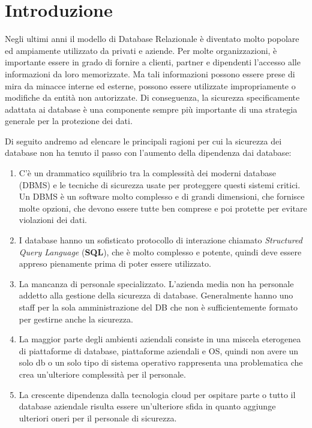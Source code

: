 \section{Introduzione}

Negli ultimi anni il modello di Database Relazionale è diventato molto popolare ed ampiamente utilizzato da
privati e aziende.
Per molte organizzazioni, è importante essere in grado di
fornire a clienti, partner e dipendenti l'accesso alle informazioni da loro memorizzate. Ma tali
informazioni possono essere prese di mira da minacce interne ed esterne, possono essere utilizzate
impropriamente o modifiche da entità non autorizzate. Di conseguenza, la sicurezza
specificamente adattata ai database è una componente sempre più importante di una strategia generale per la protezione dei dati.

Di seguito andremo ad elencare le principali ragioni per cui la sicurezza dei database non ha tenuto il passo con
l'aumento della dipendenza dai database:

\begin{enumerate}
    \item C'è un drammatico squilibrio tra la complessità dei moderni
          database (DBMS) e le tecniche di sicurezza usate per proteggere questi
          sistemi critici. Un DBMS è un software molto complesso e di grandi
          dimensioni, che fornisce molte opzioni, che devono essere tutte ben
          comprese e poi protette per evitare violazioni dei dati.
    \item I database hanno un sofisticato protocollo di interazione chiamato
          \textit{Structured Query Language} (\textbf{SQL}),
          che è molto complesso e potente, quindi deve essere appreso pienamente
          prima di poter essere utilizzato.
    \item La mancanza di personale specializzato. L'azienda media non ha
          personale addetto alla gestione della sicurezza di database.
          Generalmente hanno uno staff per la sola amministrazione del DB che
          non è sufficientemente formato per gestirne anche la sicurezza.
    \item La maggior parte degli ambienti aziendali consiste in una miscela
          eterogenea di piattaforme di database, piattaforme aziendali e OS,
          quindi non avere un solo db o un solo tipo di sistema operativo
          rappresenta una problematica che crea un'ulteriore complessità per il
          personale.
    \item La crescente dipendenza dalla tecnologia cloud per ospitare parte o
          tutto il database aziendale risulta essere un'ulteriore sfida in quanto
          aggiunge ulteriori oneri per il
          personale di sicurezza.
\end{enumerate}

